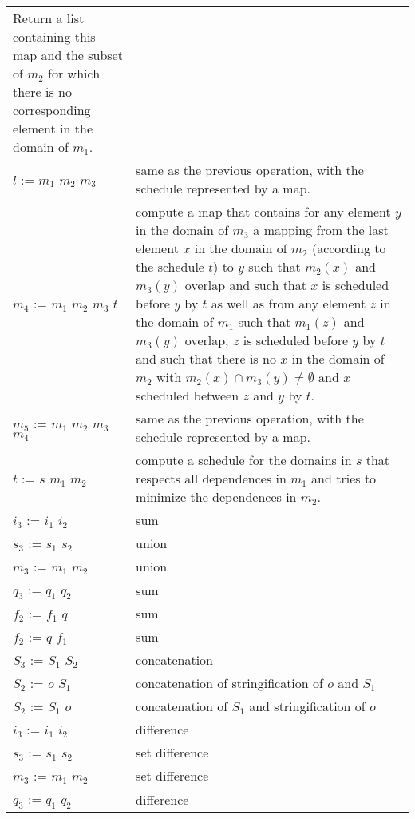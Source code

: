 \begin{supertabular}{p{0.35\textwidth}p{0.6\textwidth}}
Return a list containing this map and the subset of
$m_2$ for which there is no corresponding element in the domain of $m_1$.
\\
$l$ :=  $m_1$  $m_2$  $m_3$ &
same as the previous operation, with the schedule represented by a map.
\\
$m_4$ :=  $m_1$  $m_2$  $m_3$
 $t$ &
compute a map that contains for any element $y$ in the domain of $m_3$
a mapping from the last element $x$ in the domain of $m_2$
(according to the schedule $t$) to $y$
such that $m_2(x)$ and $m_3(y)$ overlap
and such that $x$ is scheduled before $y$ by $t$
as well as from any element $z$ in the domain of $m_1$ such that
$m_1(z)$ and $m_3(y)$ overlap,
$z$ is scheduled before $y$ by $t$
and such that there is no $x$ in the domain of $m_2$ with
$m_2(x) \cap m_3(y) \ne \emptyset$ and
$x$ scheduled between $z$ and $y$ by $t$.
\\
$m_5$ :=  $m_1$  $m_2$  $m_3$
 $m_4$ &
same as the previous operation, with the schedule represented by a map.
\\
$t$ :=  $s$  $m_1$  $m_2$ &
compute a schedule for the domains in $s$ that respects all dependences
in $m_1$ and tries to minimize the dependences in $m_2$.
\\
$i_3$ := $i_1$ \ai{$+$} $i_2$ & sum
\\
$s_3$ := $s_1$ \ai{$+$} $s_2$ & union
\\
$m_3$ := $m_1$ \ai{$+$} $m_2$ & union
\\
$q_3$ := $q_1$ \ai{$+$} $q_2$ & sum
\\
$f_2$ := $f_1$ \ai{$+$} $q$ & sum
\\
$f_2$ := $q$ \ai{$+$} $f_1$ & sum
\\
$S_3$ := $S_1$ \ai{$+$} $S_2$ & concatenation
\\
$S_2$ := $o$ \ai{$+$} $S_1$ &
concatenation of stringification of $o$ and $S_1$
\\
$S_2$ := $S_1$ \ai{$+$} $o$ &
concatenation of $S_1$ and stringification of $o$
\\
$i_3$ := $i_1$ \ai{$-$} $i_2$ & difference
\\
$s_3$ := $s_1$ \ai{$-$} $s_2$ & set difference
\\
$m_3$ := $m_1$ \ai{$-$} $m_2$ & set difference
\\
$q_3$ := $q_1$ \ai{$-$} $q_2$ & difference

\end{supertabular}
